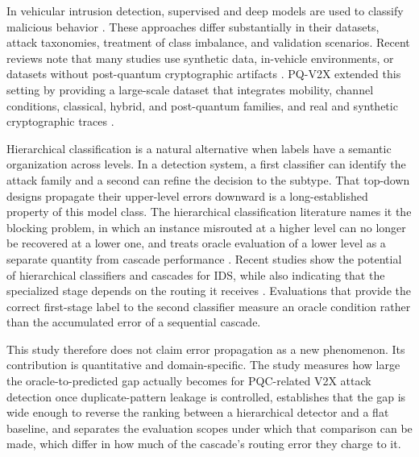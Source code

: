 \documentclass{IEEEoj}
\begin{document}
In vehicular intrusion detection, supervised and deep models are used to
classify malicious behavior \cite{105006773029,85203703051}. These approaches
differ substantially in their datasets, attack taxonomies, treatment of class
imbalance, and validation scenarios. Recent reviews note that many studies use
synthetic data, in-vehicle environments, or datasets without post-quantum
cryptographic artifacts \cite{105006773029,105029973416,85203703051}. PQ-V2X
extended this setting by providing a large-scale dataset that integrates
mobility, channel conditions, classical, hybrid, and post-quantum families, and
real and synthetic cryptographic traces \cite{105018710169}.

Hierarchical classification is a natural alternative when labels have a
semantic organization across levels. In a detection system, a first classifier
can identify the attack family and a second can refine the decision to the
subtype. That top-down designs propagate their upper-level errors downward is
a long-established property of this model class. The hierarchical
classification literature names it the blocking problem, in which an instance
misrouted at a higher level can no longer be recovered at a lower one, and
treats oracle evaluation of a lower level as a separate quantity from
cascade performance \cite{silla2011hierarchical}. Recent studies show the
potential of hierarchical classifiers and cascades for IDS, while also
indicating that the specialized stage depends on the routing it receives
\cite{S1570870525002306,105045590822}. Evaluations that provide the correct
first-stage label to the second classifier measure an oracle condition rather
than the accumulated error of a sequential cascade.

This study therefore does not claim error propagation as a new phenomenon.
Its contribution is quantitative and domain-specific. The study measures how
large the oracle-to-predicted gap actually becomes for PQC-related V2X attack
detection once duplicate-pattern leakage is controlled, establishes that the
gap is wide enough to reverse the ranking between a hierarchical detector and
a flat baseline, and separates the evaluation scopes under which that
comparison can be made, which differ in how much of the cascade's routing
error they charge to it.
\end{document}
